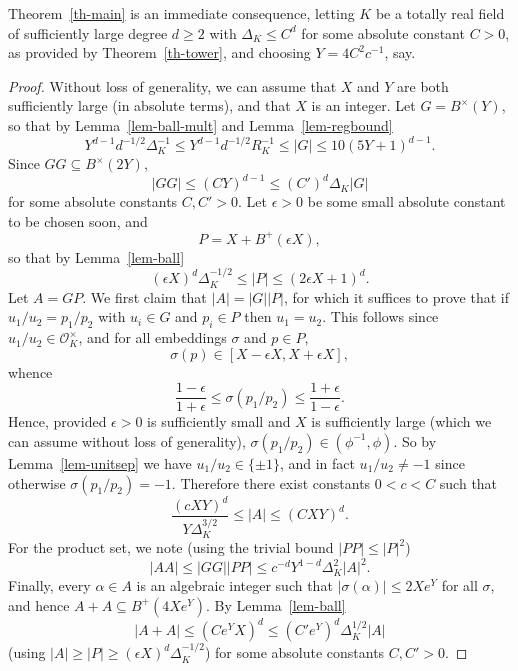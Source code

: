\documentclass{amsart}
\numberwithin{equation}{section}
\newcommand{\abs}[1]{\mathopen{}\left| #1\mathclose{}\right|}
\newcommand{\Abs}[1]{\lvert #1\rvert}
\begin{document}
Theorem~\ref{th-main} is an immediate consequence, letting $K$ be a totally real field of sufficiently large degree $d\geq 2$ with $\Delta_K \leq C^d$ for some absolute constant $C>0$, as provided by Theorem~\ref{th-tower}, and choosing $Y=4C^2c^{-1}$, say.

\begin{proof}
Without loss of generality, we can assume that $X$ and $Y$ are both sufficiently large (in absolute terms), and that $X$ is an integer. Let $G=B^\times(Y)$, so that by Lemma~\ref{lem-ball-mult} and Lemma~\ref{lem-regbound}
\[Y^{d-1}d^{-1/2}\Delta_K^{-1}\leq Y^{d-1}d^{-1/2}R_K^{-1}\leq \abs{G}\leq 10(5Y+1)^{d-1}.\]
Since $GG\subseteq B^\times(2Y)$,
\[\Abs{GG}\leq (CY)^{d-1}\leq (C')^d\Delta_K\abs{G}\]
for some absolute constants $C,C'>0$. Let $\epsilon>0$ be some small absolute constant to be chosen soon, and 
\[P=X+B^+(\epsilon X),\]
so that by Lemma~\ref{lem-ball}
\[(\epsilon X)^d\Delta_K^{-1/2}\leq\abs{P}\leq(2\epsilon X+1)^d.\]
Let $A=GP$. We first claim that $\abs{A}=\abs{G}\abs{P}$, for which it suffices to prove that if $u_1/u_2=p_1/p_2$ with $u_i\in G$ and $p_i\in P$ then $u_1= u_2$. This follows since $u_1/u_2\in \mathcal{O}_K^\times$, and for all embeddings $\sigma$ and $p\in P$,
\[\sigma(p)\in [X-\epsilon X, X+\epsilon X],\]
whence 
\[\frac{1-\epsilon}{1+\epsilon}\leq \sigma(p_1/p_2)\leq \frac{1+\epsilon}{1-\epsilon}.\]
Hence, provided $\epsilon>0$ is sufficiently small and $X$ is sufficiently large (which we can assume without loss of generality), $\sigma(p_1/p_2)\in (\phi^{-1},\phi)$. So by Lemma~\ref{lem-unitsep} we have $u_1/u_2\in \{\pm 1\}$, and in fact $u_1/u_2\neq -1$ since otherwise $\sigma(p_1/p_2)=-1$. Therefore there exist constants $0<c<C$ such that
\[\frac{(cXY)^d}{Y\Delta_K^{3/2}}\leq \abs{A}\leq (CXY)^d.\]
For the product set, we note (using the trivial bound $\abs{PP}\leq \abs{P}^2$)
\[\Abs{AA}\leq \Abs{GG}\Abs{PP}\leq  c^{-d}Y^{1-d}\Delta_K^2\abs{A}^2.\]
Finally, every $\alpha\in A$ is an algebraic integer such that $\Abs{\sigma(\alpha)}\leq 2Xe^Y$ for all $\sigma$, and hence $A+A\subseteq B^+(4Xe^Y)$. By Lemma~\ref{lem-ball}
\[\abs{A+A}\leq (Ce^YX)^d\leq (C'e^Y)^d\Delta_K^{1/2}\abs{A}\]
(using $\abs{A}\geq \abs{P}\geq (\epsilon X)^d\Delta_K^{-1/2}$) for some absolute constants $C,C'>0$.
\end{proof}
\end{document}
